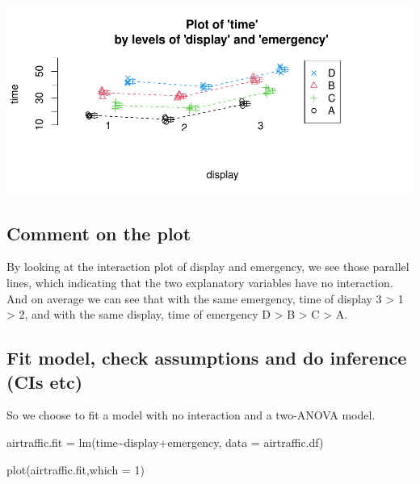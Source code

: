 \documentclass[
]{article}
\newenvironment{Shaded}{\begin{snugshade}}{\end{snugshade}}
\newcommand{\AttributeTok}[1]{\textcolor[rgb]{0.77,0.63,0.00}{#1}}
\newcommand{\DecValTok}[1]{\textcolor[rgb]{0.00,0.00,0.81}{#1}}
\newcommand{\FunctionTok}[1]{\textcolor[rgb]{0.00,0.00,0.00}{#1}}
\newcommand{\NormalTok}[1]{#1}
\newcommand{\OtherTok}[1]{\textcolor[rgb]{0.56,0.35,0.01}{#1}}
\newcommand{\SpecialCharTok}[1]{\textcolor[rgb]{0.00,0.00,0.00}{#1}}
\begin{document}
\includegraphics{STATS201_2022_SWU_A3_files/figure-latex/unnamed-chunk-8-1.pdf}

\hypertarget{comment-on-the-plot}{%
\subsection{Comment on the plot}\label{comment-on-the-plot}}

By looking at the interaction plot of display and emergency, we see
those parallel lines, which indicating that the two explanatory
variables have no interaction. And on average we can see that with the
same emergency, time of display 3 \textgreater{} 1 \textgreater{} 2, and
with the same display, time of emergency D \textgreater{} B
\textgreater{} C \textgreater{} A.

\hypertarget{fit-model-check-assumptions-and-do-inference-cis-etc}{%
\subsection{Fit model, check assumptions and do inference (CIs
etc)}\label{fit-model-check-assumptions-and-do-inference-cis-etc}}

So we choose to fit a model with no interaction and a two-ANOVA model.

\begin{Shaded}
\begin{Highlighting}[]
\NormalTok{airtraffic.fit }\OtherTok{=} \FunctionTok{lm}\NormalTok{(time}\SpecialCharTok{\textasciitilde{}}\NormalTok{display}\SpecialCharTok{+}\NormalTok{emergency, }\AttributeTok{data =}\NormalTok{ airtraffic.df)}
\end{Highlighting}
\end{Shaded}

\begin{Shaded}
\begin{Highlighting}[]
\FunctionTok{plot}\NormalTok{(airtraffic.fit,}\AttributeTok{which =} \DecValTok{1}\NormalTok{)}
\end{Highlighting}
\end{Shaded}
\end{document}
